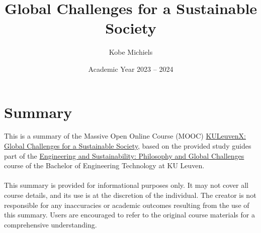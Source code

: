 \documentclass[kul]{kulakarticle} %
\title{Global Challenges for a Sustainable Society}
\author{Kobe Michiels}
\date{Academic Year 2023 -- 2024}
\begin{document}
\maketitle

\section*{Summary}

This is a summary of the Massive Open Online Course (MOOC) \href{https://www.edx.org/learn/science/ku-leuven-global-challenges-for-a-sustainable-society?webview=false&campaign=Global+Challenges+for+a+Sustainable+Society&source=edx&product_category=course&placement_url=https%3A%2F%2Fwww.edx.org%2Fschool%2Fkuleuvenx}{KULeuvenX: Global Challenges for a Sustainable Society}, based on the provided study guides part of the \href{https://onderwijsaanbod.kuleuven.be/syllabi/v/e/T3AID1E.htm#activetab=inhoud_idp1690064}{Engineering and Sustainability: Philosophy and Global Challenges} course of the Bachelor of Engineering Technology at KU Leuven.
\\\\
This summary is provided for informational purposes only. It may not cover all course details, and its use is at the discretion of the individual. The creator is not responsible for any inaccuracies or academic outcomes resulting from the use of this summary. Users are encouraged to refer to the original course materials for a comprehensive understanding.

\setcounter{tocdepth}{2}
\tableofcontents
\newpage

\newpage

\newpage

\newpage

\newpage

\newpage

\newpage

\newpage

\newpage

\newpage

\newpage

\newpage

\newpage

\end{document}
